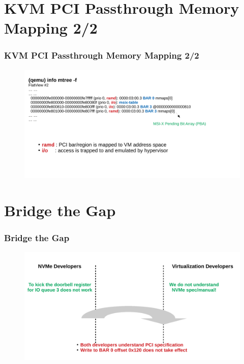 \documentclass[aspectratio=169]{beamer}
\begin{document}

\section{KVM PCI Passthrough Memory Mapping 2/2}
\begin{frame}
\frametitle{KVM PCI Passthrough Memory Mapping 2/2}
\begin{figure}
\includegraphics[width=1.0\linewidth]{figures/flatview.pdf}
\end{figure}
\end{frame}


\section{Bridge the Gap}
\begin{frame}
\frametitle{Bridge the Gap}
\begin{figure}
\includegraphics[width=1.0\linewidth]{figures/bridge.pdf}
\end{figure}
\end{frame}

\end{document}
